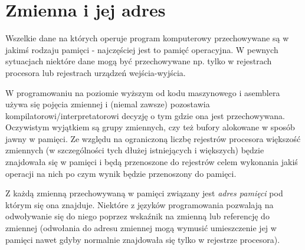 % 
% 
% 
% 

\section{Zmienna i jej adres}

Wszelkie dane na których operuje program komputerowy przechowywane są w jakimś rodzaju pamięci - najczęściej jest to pamięć operacyjna. W pewnych sytuacjach niektóre dane mogą być przechowywane np. tylko w rejestrach procesora lub rejestrach urządzeń wejścia-wyjścia.

W programowaniu na poziomie wyższym od kodu maszynowego i asemblera używa się pojęcia zmiennej i (niemal zawsze) pozostawia kompilatorowi/interpretatorowi decyzję o tym gdzie ona jest przechowywana. Oczywistym wyjątkiem są grupy zmiennych, czy też bufory alokowane w sposób jawny w pamięci. Ze względu na ograniczoną liczbę rejestrów procesora większość zmiennych (w szczególności tych dłużej istniejących i większych) będzie znajdowała się w pamięci i będą przenoszone do rejestrów celem wykonania jakiś operacji na nich po czym wynik będzie przenoszony do pamięci.

Z każdą zmienną przechowywaną w pamięci związany jest \emph{adres pamięci} pod którym się ona znajduje. Niektóre z języków programowania pozwalają na odwoływanie się do niego poprzez wskaźnik na zmienną lub referencję do zmiennej (odwołania do adresu zmiennej mogą wymusić umieszczenie jej w pamięci nawet gdyby normalnie znajdowała się tylko w rejestrze procesora).


